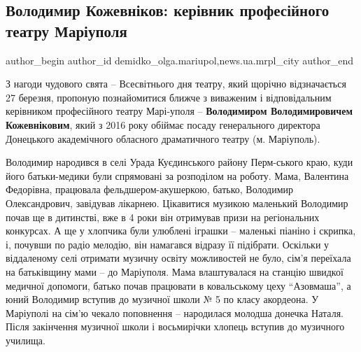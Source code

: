  
 
 
 
 
 
\subsection{Володимир Кожевніков: керівник професійного театру Маріуполя}
\label{sec:26_03_2019.stz.news.ua.mrpl_city.1.volodymyr_kozhevnikov_kerivnyk_prof_teatru}
 
\ifcmt
 author_begin
   author_id demidko_olga.mariupol,news.ua.mrpl_city
 author_end
\fi

З нагоди чудового свята – Всесвітнього дня театру, який щорічно відзначається
27 березня, пропоную познайомитися ближче з виваженим і відповідальним
керівником професійного театру Марі\hyp{}уполя – \textbf{Володимиром Володимировичем
Кожевніковим}, який з 2016 року обіймає посаду генерального директора Донецького
академічного обласного драматичного театру (м. Маріуполь).


Володимир народився в селі Урада Куєдинського району Перм\hyp{}ського краю, куди його
батьки-медики були спрямовані за розподілом на роботу. Мама, Валентина
Федорівна, працювала фельдшером-акушеркою, батько,  Володимир Олександрович,
завідував лікарнею. Цікавитися музикою маленький Володимир почав ще в
дитинстві, вже в 4 роки він отримував призи на регіональних конкурсах. А ще у
хлопчика були улюблені іграшки – маленькі піаніно і скрипка, і, почувши по
радіо мелодію, він намагався відразу її підібрати. Оскільки у віддаленому селі
отримати музичну освіту можливостей не було, сім'я переїхала на батьківщину
мами – до Маріуполя. Мама влаштувалася на станцію швидкої медичної допомоги,
батько почав працювати в ковальському цеху \enquote{Азовмаша}, а юний Володимир вступив
до музичної школи № 5 по класу акордеона. У Маріуполі на сім'ю чекало
поповнення – народилася молодша донечка Наталя. Після закінчення музичної школи
і восьмирічки хлопець вступив до музичного училища.

